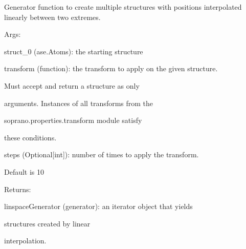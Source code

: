 \documentclass[letterpaper,10pt,english]{sphinxmanual}
\begin{document}
\begin{fulllineitems}
\label{doctree/soprano.collection.generate.transform:soprano.collection.generate.transform.transformGen}
Generator function to create multiple structures with positions
interpolated linearly between two extremes.

\begin{DUlineblock}{0em}
\item[] Args:
\item[]
\begin{DUlineblock}{\DUlineblockindent}
\item[] struct\_0 (ase.Atoms): the starting structure
\item[] transform (function): the transform to apply on the given structure.
\item[]
\begin{DUlineblock}{\DUlineblockindent}
\item[] Must accept and return a structure as only
\item[] arguments. Instances of all transforms from the
\item[] soprano.properties.transform module satisfy
\item[] these conditions.
\end{DUlineblock}
\item[] steps (Optional{[}int{]}): number of times to apply the transform.
\item[]
\begin{DUlineblock}{\DUlineblockindent}
\item[] Default is 10
\end{DUlineblock}
\end{DUlineblock}
\end{DUlineblock}

\begin{DUlineblock}{0em}
\item[] Returns:
\item[]
\begin{DUlineblock}{\DUlineblockindent}
\item[] linspaceGenerator (generator): an iterator object that yields
\item[]
\begin{DUlineblock}{\DUlineblockindent}
\item[] structures created by linear
\item[] interpolation.
\end{DUlineblock}
\end{DUlineblock}
\end{DUlineblock}

\end{fulllineitems}
\end{document}
